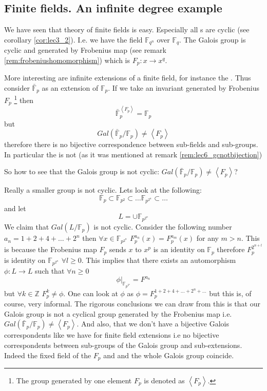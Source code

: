 \subsection{Finite fields. An infinite degree example}
\label{sec:lec6_finitefield}
We have seen that theory of finite fields is easy. Especially all
s are cyclic (see corollary
\ref{cor:lec3_2}). I.e. we have the field $\mathbb{F}_{q^n}$ over
$\mathbb{F}_{q}$. The Galois group is cyclic and generated by
Frobenius map (see remark \ref{rem:frobeniushomomorphism}) which is
$F_p: x \to x^q$.

More interesting are infinite extensions of a finite field, for
instance the .
Thus consider $\bar{\mathbb{F}}_p$ as an extension of
$\mathbb{F}_p$. If we take an invariant generated by Frobenius $F_p$
\footnote {
  The group generated by one element $F_p$ is denoted as $\left<F_p\right>$.
}
then
\[
\bar{\mathbb{F}}_p^{\left<F_p\right>} = \mathbb{F}_p
\]
but
\[
Gal\left(\bar{\mathbb{F}}_p/\mathbb{F}_p\right) \ne
\left<F_p\right>
\]
therefore there is no bijective correspondence between sub-fields and
sub-groups. In particular the  is
not  (as it was mentioned at remark
\ref{rem:lec6_gcnotbijection})

So how to see that the Galois group is not cyclic:
$Gal\left(\bar{\mathbb{F}}_p/\mathbb{F}_p\right) \ne
\left<F_p\right>$?

Really a smaller group is not cyclic. Lets look at the following:
\[
\mathbb{F}_p \subset \mathbb{F}_{p^2} \subset \dots
\mathbb{F}_{p^{2^n}} \subset \dots
\]
and let
\[
L = \cup \mathbb{F}_{p^{2^n}}
\]
We claim that $Gal\left(L/\mathbb{F}_p\right)$ is not cyclic. Consider
the following number $a_n = 1+ 2 + 4 + \dots + 2^n$ then $\forall x
\in \mathbb{F}_{p^{2^n}}$
$F_p^{a_n}\left(x\right) = F_p^{a_m}\left(x\right)$ for any $m >
n$. This is because the Frobenius map $F_p$ sends $x$ to $x^p$ is an
identity on $\mathbb{F}_p$ therefore $F_p^{2^{n+l}}$ is identity on
$\mathbb{F}_{p^{2^n}}$ $\forall l \ge 0$. This implies that
there exists an automorphism $\phi: L \to L$ such that $\forall n
\ge 0$
\[
\left.\phi\right|_{\mathbb{F}_{p^{2^n}}} = F^{a_n}
\]
but $\forall k \in \mathbb{Z}$ $F_p^k \ne \phi$. One can look at
$\phi$ as $\phi = F_p^{1+2+4+ \dots + 2^n + \dots}$ but this is, of
course, very informal. The rigorous conclusions we can draw from this
is that our Galois group is not a cyclical group generated by the
Frobenius map i.e.
$Gal\left(\bar{\mathbb{F}}_p/\mathbb{F}_p\right) \ne
\left<F_p\right>$. And also, that we don't have a bijective Galois
correspondents like we have for finite field extensions i.e no
bijective correspondents  between sub-groups 
of the Galois group and sub-extensions. Indeed the fixed field of the
$F_p$ and and the whole Galois group coincide.  

